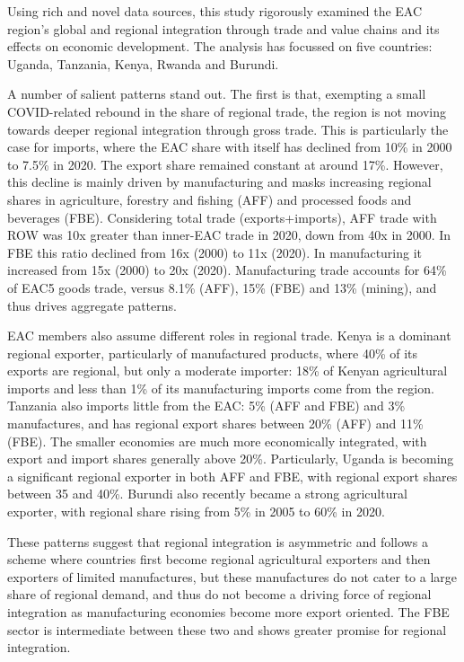 \documentclass[a4paper]{article}
\begin{document}
Using rich and novel data sources, this study rigorously examined the EAC region's global and regional integration through trade and value chains and its effects on economic development. The analysis has focussed on five countries: Uganda, Tanzania, Kenya, Rwanda and Burundi. \newline

A number of salient patterns stand out. The first is that, exempting a small COVID-related rebound in the share of regional trade, the region is not moving towards deeper regional integration through gross trade. This is particularly the case for imports, where the EAC share with itself has declined from 10\% in 2000 to 7.5\% in 2020. The export share remained constant at around 17\%. However, this decline is mainly driven by manufacturing and masks increasing regional shares in agriculture, forestry and fishing (AFF) and processed foods and beverages (FBE). Considering total trade (exports+imports), AFF trade with ROW was 10x greater than inner-EAC trade in 2020, down from 40x in 2000. In FBE this ratio declined from 16x (2000) to 11x (2020). In manufacturing it increased from 15x (2000) to 20x (2020). Manufacturing trade accounts for 64\% of EAC5 goods trade, versus  8.1\% (AFF), 15\% (FBE) and 13\% (mining), and thus drives aggregate patterns. \newline 

EAC members also assume different roles in regional trade. Kenya is a dominant regional exporter, particularly of manufactured products, where 40\% of its exports are regional, but only a moderate importer: 18\% of Kenyan agricultural imports and less than 1\% of its manufacturing imports come from the region. Tanzania also imports little from the EAC: 5\% (AFF and FBE) and 3\% manufactures, and has regional export shares between 20\% (AFF) and 11\% (FBE). The smaller economies are much more economically integrated, with export and import shares generally above 20\%. Particularly, Uganda is becoming a significant regional exporter in both AFF and FBE, with regional export shares between 35 and 40\%. Burundi also recently became a strong agricultural exporter, with regional share rising from 5\% in 2005 to 60\% in 2020. \newline

These patterns suggest that regional integration is asymmetric and follows a scheme where countries first become regional agricultural exporters and then exporters of limited manufactures, but these manufactures do not cater to a large share of regional demand, and thus do not become a driving force of regional integration as manufacturing economies become more export oriented. The FBE sector is intermediate between these two and shows greater promise for regional integration. \newline
\end{document}
